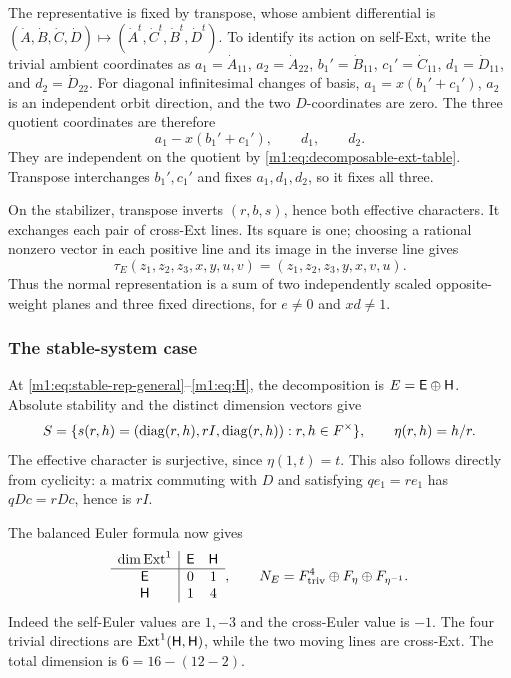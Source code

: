 The representative is fixed by transpose, whose ambient differential is
$(\dot A,\dot B,\dot C,\dot D)\mapsto
(\dot A^t,\dot C^t,\dot B^t,\dot D^t)$. To identify its action on
self-Ext, write the trivial ambient coordinates as
$a_1=\dot A_{11}$, $a_2=\dot A_{22}$, $b_1'=\dot B_{11}$,
$c_1'=\dot C_{11}$, $d_1=\dot D_{11}$, and $d_2=\dot D_{22}$.
For diagonal infinitesimal changes of basis,
$a_1=x(b_1'+c_1')$, $a_2$ is an independent orbit direction, and
the two $D$-coordinates are zero. The three quotient coordinates are
therefore
\begin{equation}\label{m1:eq:decomposable-fixed-coordinates}
 a_1-x(b_1'+c_1'),\qquad d_1,\qquad d_2.
\end{equation}
They are independent on the quotient by
\eqref{m1:eq:decomposable-ext-table}. Transpose interchanges $b_1',c_1'$
and fixes $a_1,d_1,d_2$, so it fixes all three.

On the stabilizer, transpose inverts $(r,b,s)$, hence both effective
characters. It exchanges each pair of cross-Ext lines. Its square is
one; choosing a rational nonzero vector in each positive line and its
image in the inverse line gives
\begin{equation}\label{m1:eq:decomposable-transpose}
 \tau_E(z_1,z_2,z_3,x,y,u,v)=(z_1,z_2,z_3,y,x,v,u).
\end{equation}
Thus the normal representation is a sum of two independently scaled
opposite-weight planes and three fixed directions, for $e\neq0$ and $xd\neq1$.

\subsubsection{The stable-system case}\label{m1:subsec:stable-normal}
At \eqref{m1:eq:stable-rep-general}--\eqref{m1:eq:H}, the decomposition is
$E=\mathsf E\oplus\mathsf H$. Absolute stability and the distinct dimension
vectors give
\begin{equation}\label{m1:eq:stable-stabilizer}
 S=\{s(r,h)=(\operatorname{diag}(r,h),rI,\operatorname{diag}(r,h)):r,h\in F^\times\},
 \qquad\eta(r,h)=h/r.
\end{equation}
The effective character is surjective, since $\eta(1,t)=t$. This also
follows directly from cyclicity: a matrix commuting with $D$ and
satisfying $qe_1=re_1$ has $qDc=rDc$, hence is $rI$.

The balanced Euler formula now gives
\begin{equation}\label{m1:eq:stable-ext-table}
 \begin{array}{c|cc}
 \dim\operatorname{Ext}^1&\mathsf E&\mathsf H\\\hline
 \mathsf E&0&1\\\mathsf H&1&4
 \end{array},\qquad
 N_E=F^4_{\mathrm{triv}}\oplus F_\eta\oplus F_{\eta^{-1}}.
\end{equation}
Indeed the self-Euler values are $1,-3$ and the cross-Euler value is
$-1$. The four trivial directions are $\operatorname{Ext}^1(\mathsf H,\mathsf H)$, while the
two moving lines are cross-Ext. The total dimension is $6=16-(12-2)$.

